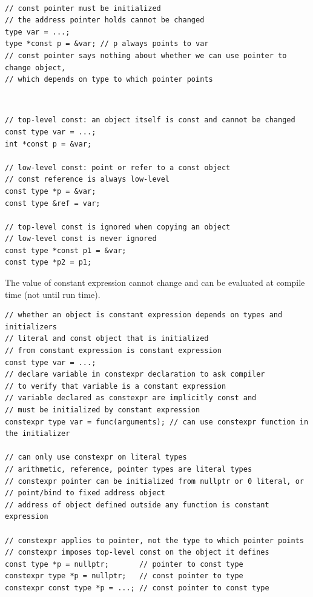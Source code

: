 \documentclass{blog}
\begin{document}
\begin{definition}~
    \begin{verbatim}
// const pointer must be initialized
// the address pointer holds cannot be changed
type var = ...;
type *const p = &var; // p always points to var
// const pointer says nothing about whether we can use pointer to change object,
// which depends on type to which pointer points
\end{verbatim}
\end{definition}

\begin{definition}~
    \begin{verbatim}
// top-level const: an object itself is const and cannot be changed
const type var = ...;
int *const p = &var;

// low-level const: point or refer to a const object
// const reference is always low-level
const type *p = &var;
const type &ref = var;

// top-level const is ignored when copying an object
// low-level const is never ignored
const type *const p1 = &var;
const type *p2 = p1;
\end{verbatim}
\end{definition}

\begin{definition}[constexpr]
    The value of constant expression cannot change and can be evaluated at compile time (not until run time).
    \begin{verbatim}
// whether an object is constant expression depends on types and initializers
// literal and const object that is initialized
// from constant expression is constant expression
const type var = ...;
// declare variable in constexpr declaration to ask compiler
// to verify that variable is a constant expression
// variable declared as constexpr are implicitly const and
// must be initialized by constant expression
constexpr type var = func(arguments); // can use constexpr function in the initializer

// can only use constexpr on literal types
// arithmetic, reference, pointer types are literal types
// constexpr pointer can be initialized from nullptr or 0 literal, or
// point/bind to fixed address object
// address of object defined outside any function is constant expression

// constexpr applies to pointer, not the type to which pointer points
// constexpr imposes top-level const on the object it defines
const type *p = nullptr;       // pointer to const type
constexpr type *p = nullptr;   // const pointer to type
constexpr const type *p = ...; // const pointer to const type
\end{verbatim}
\end{definition}
\end{document}
